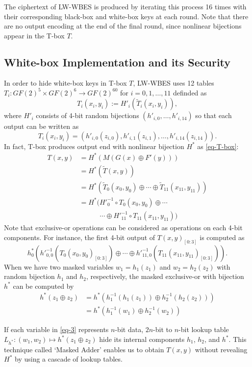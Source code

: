 \documentclass{ieeeaccess}
\begin{document}
The ciphertext of LW-WBES is produced by iterating this process 16 times
with their corresponding black-box and white-box keys at each round.
Note that there are no output encoding at the end of the final round,
since nonlinear bijections appear in the T-box $T$.

\subsection{White-box Implementation and its Security}

In order to hide white-box keys in T-box $T$,
LW-WBES uses 12 tables $T_i: GF(2)^5 \times GF(2)^6 \to GF(2)^{60}$
for $i=0,1,\ldots, 11$ definded as
\[
T_i(x_i, y_i) := H'_i(\tilde T_i(x_i, y_i)),
\]
where $H'_i$ consists of 4-bit random bijections
$(h'_{i,0}, \ldots, h'_{i,14})$ so that
each output can be written as
\[
T_i(x_i, y_i) = (h'_{i,0}(z_{i,0}), h'_{i,1}(z_{i,1}), \ldots, h'_{i,14}(z_{i,14})).
\]
In fact, T-box produces output end with nonlinear bijection $H^*$ as \eqref{eq-T-box}:
\begin{align}
T(x,y) &= H^*(M(G(x)\oplus F'(y))) \nonumber \\
&= H^*(\tilde T(x,y)) \nonumber \\
&= H^*\left( \tilde T_0(x_0, y_0) \oplus \cdots \oplus \tilde T_{11}(x_{11}, y_{11})
\right) \nonumber \\
&= H^*\Big( H'^{-1}_0\circ T_0(x_0, y_0) \oplus \cdots \nonumber \\
& \quad\quad\quad \cdots \oplus H'^{-1}_{11}\circ T_{11}(x_{11}, y_{11})
\Big)   \label{eq-2}
\end{align}
Note that exclusive-or operations can be considered as 
operations on each 4-bit components. 
For instance, the first 4-bit output of $T(x,y)_{[0:3]}$ is
computed as
\[
h^*_0\left(
h'^{-1}_{0,0}(T_0(x_0,y_0)_{[0:3]}) \oplus \cdots
\oplus h'^{-1}_{11,0}(T_{11}(x_{11},y_{11})_{[0:3]})
\right).
\]
When we have two masked variables $w_1=h_1(z_1)$ and $w_2=h_2(z_2)$
with random bijection $h_1$ and $h_2$, respectively,
the masked exclusive-or with bijection $h^*$ can be computed by
\begin{align}
h^*(z_1 \oplus z_2)
& = h^*\left(
h_1^{-1}(h_1(z_1)) \oplus h_2^{-1}(h_2(z_2)) \right) \nonumber \\
&= h^*\left( h_1^{-1}(w_1) \oplus h_2^{-1}(w_2) \right) \label{eq-3}
\end{align}

If each variable in \eqref{eq-3} represents $n$-bit data,
$2n$-bit to $n$-bit lookup table $L_{h^*}: (w_1, w_2) \mapsto h^*(z_1 \oplus z_2)$
hide its internal components $h_1$, $h_2$, and $h^*$.
This technique called `Masked Adder' enables us to obtain $T(x,y)$
without revealing $H^*$ by using a cascade of lookup tables.
\end{document}
